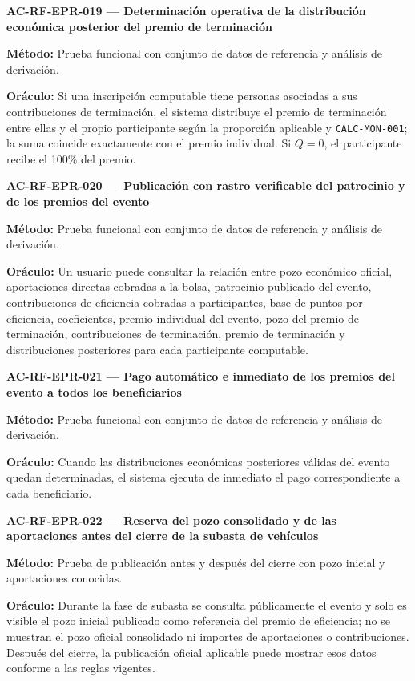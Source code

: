 \documentclass[10pt,letterpaper]{article}
\begin{document}
\noindent\textbf{AC-RF-EPR-019 --- Determinación operativa de la distribución económica posterior del premio de terminación}\par
\textbf{Método:} Prueba funcional con conjunto de datos de referencia y análisis de derivación.\par
\textbf{Oráculo:} Si una inscripción computable tiene personas asociadas a sus contribuciones de terminación, el sistema distribuye el premio de terminación entre ellas y el propio participante según la proporción aplicable y \texttt{CALC-MON-001}; la suma coincide exactamente con el premio individual. Si $Q=0$, el participante recibe el 100\% del premio.\par\vspace{0.45em}
\noindent\textbf{AC-RF-EPR-020 --- Publicación con rastro verificable del patrocinio y de los premios del evento}\par
\textbf{Método:} Prueba funcional con conjunto de datos de referencia y análisis de derivación.\par
\textbf{Oráculo:} Un usuario puede consultar la relación entre pozo económico oficial, aportaciones directas cobradas a la bolsa, patrocinio publicado del evento, contribuciones de eficiencia cobradas a participantes, base de puntos por eficiencia, coeficientes, premio individual del evento, pozo del premio de terminación, contribuciones de terminación, premio de terminación y distribuciones posteriores para cada participante computable.\par\vspace{0.45em}
\noindent\textbf{AC-RF-EPR-021 --- Pago automático e inmediato de los premios del evento a todos los beneficiarios}\par
\textbf{Método:} Prueba funcional con conjunto de datos de referencia y análisis de derivación.\par
\textbf{Oráculo:} Cuando las distribuciones económicas posteriores válidas del evento quedan determinadas, el sistema ejecuta de inmediato el pago correspondiente a cada beneficiario.\par\vspace{0.45em}
\noindent\textbf{AC-RF-EPR-022 --- Reserva del pozo consolidado y de las aportaciones antes del cierre de la subasta de vehículos}\par
\textbf{Método:} Prueba de publicación antes y después del cierre con pozo inicial y aportaciones conocidas.\par
\textbf{Oráculo:} Durante la fase de subasta se consulta públicamente el evento y solo es visible el pozo inicial publicado como referencia del premio de eficiencia; no se muestran el pozo oficial consolidado ni importes de aportaciones o contribuciones. Después del cierre, la publicación oficial aplicable puede mostrar esos datos conforme a las reglas vigentes.\par\vspace{0.45em}
\end{document}

